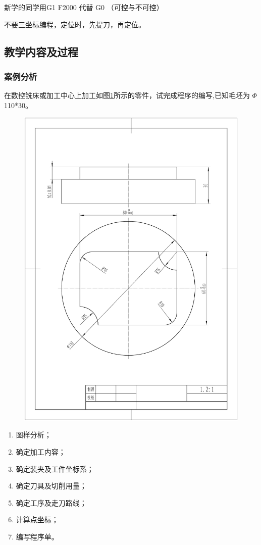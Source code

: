 新学的同学用G1 F2000 代替 G0 （可控与不可控）

不要三坐标编程，定位时，先提刀，再定位。

\subsection{教学内容及过程}
\subsubsection{案例分析}

在数控铣床或加工中心上加工如图\ref{fig:4-1}所示的零件，试完成程序的编写,已知毛坯为 $\Phi$ 110*30。

\begin{figure}[h]
    \centering
    \includegraphics[width=0.8\linewidth,trim=50 150 50 100,clip]{data/image/4-1.jpg}
    \caption{}
    \label{fig:4-1}
\end{figure}

\begin{enumerate}[1、]
    \item 图样分析；
    \item 确定加工内容；
    \item 确定装夹及工件坐标系；
    \item 确定刀具及切削用量；
    \item 确定工序及走刀路线；
    \item 计算点坐标；
    \item 编写程序单。
\end{enumerate}

